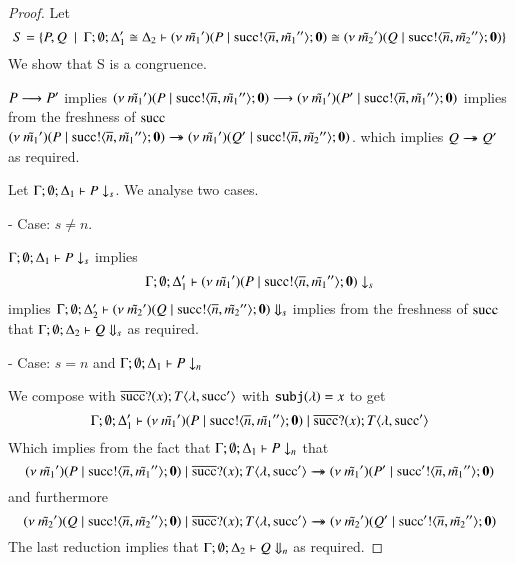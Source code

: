 \begin{proof}
	\noi Let
\[
	S = \{P, Q \ \ |\ \  \Gamma; \emptyset; \Delta_1' \cong \Delta_2 \vdash (\nu\ \tilde{m_1}')(P \;|\; \textrm{succ} ! \langle \overline{n}, \tilde{m_1}'' \rangle ; \mathbf{0}) \cong (\nu\ \tilde{m_2}')(Q \;|\; \textrm{succ} ! \langle \overline{n}, \tilde{m_2}'' \rangle ; \mathbf{0})\}
\]
	\noi We show that S is a congruence.


	\noi $P \longrightarrow P'$
	implies
	$(\nu\ \tilde{m_1}')(P \;|\; \textrm{succ} ! \langle \overline{n}, \tilde{m_1}'' \rangle ; \mathbf{0}) \longrightarrow (\nu\ \tilde{m_1}')(P' \;|\; \textrm{succ} ! \langle \overline{n}, \tilde{m_1}'' \rangle ; \mathbf{0})$
	implies from the freshness of $\textrm{succ}$
	$(\nu\ \tilde{m_1}')(P \;|\; \textrm{succ} ! \langle \overline{n}, \tilde{m_1}'' \rangle ; \mathbf{0}) \rightarrow\!\!\!\!\!\rightarrow (\nu\ \tilde{m_1}')(Q' \;|\; \textrm{succ} ! \langle \overline{n}, \tilde{m_2}'' \rangle ; \mathbf{0})$.
	which implies
	$Q \rightarrow\!\!\!\!\!\rightarrow Q'$ as required.


	\noi Let $\Gamma; \emptyset; \Delta_1 \vdash P \downarrow_{s}$. We analyse two cases.

	\noi - Case: $s \not= n$.

	\noi $\Gamma; \emptyset; \Delta_1 \vdash P \downarrow_{s}$
	implies
\[
	\Gamma; \emptyset; \Delta_1' \vdash (\nu\ \tilde{m_1}')(P \;|\; \textrm{succ} ! \langle \overline{n}, \tilde{m_1}'' \rangle ; \mathbf{0}) \downarrow_{s}
\]
	\noi implies
	$\Gamma; \emptyset; \Delta_2' \vdash (\nu\ \tilde{m_2}')(Q \;|\; \textrm{succ} ! \langle \overline{n}, \tilde{m_2}'' \rangle ; \mathbf{0}) \Downarrow_{s}$
	implies from the freshness of $\textrm{succ}$ that
	$\Gamma; \emptyset; \Delta_2 \vdash Q \Downarrow_{s}$ as required.

	\noi - Case: $s = n$ and $\Gamma; \emptyset; \Delta_1 \vdash P \downarrow_{n}$

	\noi We compose with $\overline{\textrm{succ}} ? (x) ; T\langle \lambda, \textrm{succ}' \rangle$ with $\mathtt{subj}(\lambda) = x$ to get
\[
	\Gamma; \emptyset; \Delta_1' \vdash (\nu\ \tilde{m_1}')(P \;|\; \textrm{succ} ! \langle \overline{n}, \tilde{m_1}'' \rangle ; \mathbf{0}) \;|\; \overline{\textrm{succ}} ? (x) ; T\langle \lambda, \textrm{succ}' \rangle
\]
	\noi Which implies from the fact that $\Gamma; \emptyset; \Delta_1 \vdash P \downarrow_{n}$ that
\[
		(\nu\ \tilde{m_1}')(P \;|\; \textrm{succ} ! \langle \overline{n}, \tilde{m_1}'' \rangle ; \mathbf{0}) \;|\; \overline{\textrm{succ}} ? (x) ; T\langle \lambda, \textrm{succ}' \rangle \rightarrow\!\!\!\!\!\rightarrow 
	(\nu\ \tilde{m_1}')(P' \;|\; \textrm{succ}' ! \langle \overline{n}, \tilde{m_1}'' \rangle ; \mathbf{0})
\]
	\noi and furthermore
\[
	(\nu\ \tilde{m_2}')(Q \;|\; \textrm{succ} ! \langle \overline{n}, \tilde{m_2}'' \rangle ; \mathbf{0}) \;|\; \overline{\textrm{succ}} ? (x) ; T\langle \lambda, \textrm{succ}' \rangle \rightarrow\!\!\!\!\!\rightarrow 
	(\nu\ \tilde{m_2}')(Q' \;|\; \textrm{succ}' ! \langle \overline{n}, \tilde{m_2}'' \rangle ; \mathbf{0})
\]
	\noi The last reduction implies that
	$\Gamma; \emptyset; \Delta_2 \vdash Q \Downarrow_{n}$ as required.


\end{proof}

